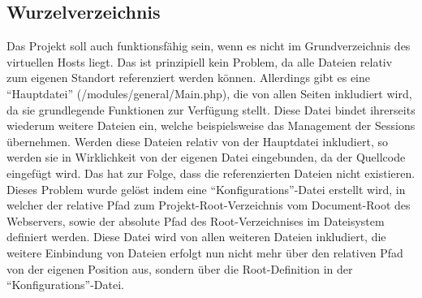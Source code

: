 \subsection{Wurzelverzeichnis}
\label{sec:content_solutions_root}
Das Projekt soll auch funktionsfähig sein, wenn es nicht im Grundverzeichnis des virtuellen Hosts liegt. Das ist prinzipiell kein Problem, da alle Dateien relativ zum eigenen Standort referenziert werden können. Allerdings gibt es eine \enquote{Hauptdatei} (/modules/general/Main.php), die von allen Seiten inkludiert wird, da sie grundlegende Funktionen zur Verfügung stellt. Diese Datei bindet ihrerseits wiederum weitere Dateien ein, welche beispielsweise das Management der Sessions übernehmen. Werden diese Dateien relativ von der Hauptdatei  inkludiert, so werden sie in Wirklichkeit von der eigenen Datei eingebunden, da der Quellcode eingefügt wird. Das hat zur Folge, dass die referenzierten Dateien nicht existieren.\\
Dieses Problem wurde gelöst indem eine \enquote{Konfigurations}-Datei erstellt wird, in welcher der relative Pfad zum Projekt-Root-Verzeichnis vom Document-Root des Webservers, sowie der absolute Pfad des Root-Verzeichnises im Dateisystem definiert werden. Diese Datei wird von allen weiteren Dateien inkludiert, die weitere Einbindung von Dateien erfolgt nun nicht mehr über den relativen Pfad von der eigenen Position aus, sondern über die Root-Definition in der \enquote{Konfigurations}-Datei.